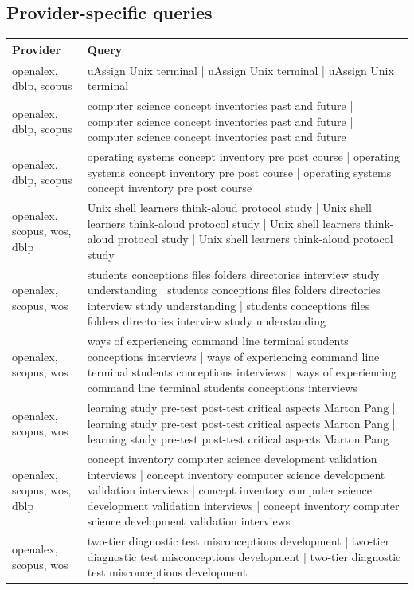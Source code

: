 \documentclass{article}
\begin{document}
\subsection{Provider-specific queries}
\begin{longtable}{lp{10cm}}
\toprule
Provider & Query \\
\midrule
openalex, dblp, scopus & uAssign Unix terminal | uAssign Unix terminal | uAssign Unix terminal \\
openalex, dblp, scopus & computer science concept inventories past and future | computer science concept inventories past and future | computer science concept inventories past and future \\
openalex, dblp, scopus & operating systems concept inventory pre post course | operating systems concept inventory pre post course | operating systems concept inventory pre post course \\
openalex, scopus, wos, dblp & Unix shell learners think-aloud protocol study | Unix shell learners think-aloud protocol study | Unix shell learners think-aloud protocol study | Unix shell learners think-aloud protocol study \\
openalex, scopus, wos & students conceptions files folders directories interview study understanding | students conceptions files folders directories interview study understanding | students conceptions files folders directories interview study understanding \\
openalex, scopus, wos & ways of experiencing command line terminal students conceptions interviews | ways of experiencing command line terminal students conceptions interviews | ways of experiencing command line terminal students conceptions interviews \\
openalex, scopus, wos & learning study pre-test post-test critical aspects Marton Pang | learning study pre-test post-test critical aspects Marton Pang | learning study pre-test post-test critical aspects Marton Pang \\
openalex, scopus, wos, dblp & concept inventory computer science development validation interviews | concept inventory computer science development validation interviews | concept inventory computer science development validation interviews | concept inventory computer science development validation interviews \\
openalex, scopus, wos & two-tier diagnostic test misconceptions development | two-tier diagnostic test misconceptions development | two-tier diagnostic test misconceptions development \\

\end{longtable}
\end{document}
